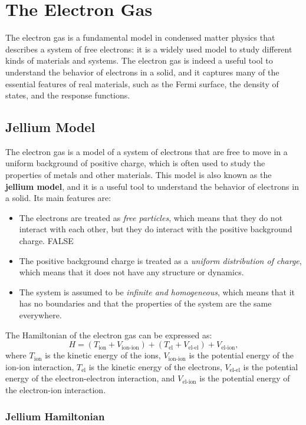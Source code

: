 \chapter{The Electron Gas}

The electron gas is a fundamental model in condensed matter physics that describes a system of free electrons: it is a widely used model to study different kinds of materials and systems. The electron gas is indeed a useful tool to understand the behavior of electrons in a solid, and it captures many of the essential features of real materials, such as the Fermi surface, the density of states, and the response functions.

\section{Jellium Model}

The electron gas is a model of a system of electrons that are free to move in a uniform background of positive charge, which is often used to study the properties of metals and other materials. This model is also known as the \textbf{jellium model}, and it is a useful tool to understand the behavior of electrons in a solid. Its main features are:
\begin{itemize}
    \item The electrons are treated as \textit{free particles}, which means that they do not interact with each other, but they do interact with the positive background charge. FALSE
    \item The positive background charge is treated as a \textit{uniform distribution of charge}, which means that it does not have any structure or dynamics.
    \item The system is assumed to be \textit{infinite and homogeneous}, which means that it has no boundaries and that the properties of the system are the same everywhere.
\end{itemize}
The Hamiltonian of the electron gas can be expressed as:
\[
    H = (T_{\text{ion}} + V_{\text{ion-ion}}) + (T_{\text{el}} + V_{\text{el-el}}) + V_{\text{el-ion}},
\]
where \(T_{\text{ion}}\) is the kinetic energy of the ions, \(V_{\text{ion-ion}}\) is the potential energy of the ion-ion interaction, \(T_{\text{el}}\) is the kinetic energy of the electrons, \(V_{\text{el-el}}\) is the potential energy of the electron-electron interaction, and \(V_{\text{el-ion}}\) is the potential energy of the electron-ion interaction.

\subsection{Jellium Hamiltonian}

